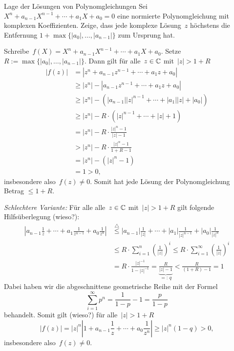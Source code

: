 \documentclass{algblatt}
\begin{document}
\vspace*{-1.5cm}

\begin{aufgabe}{Lage der Lösungen von Polynomgleichungen}
Sei $X^n + a_{n - 1} X^{n - 1} + \cdots + a_1 X + a_0 = 0$ eine normierte
Polynomgleichung mit komplexen Koeffizienten. Zeige, dass jede komplexe
Lösung~$z$ höchstens die Entfernung
$1+\max\{|a_0|,\ldots,|a_{n-1}|\}$ zum Ursprung hat.
\begin{loesung}
Schreibe~$f(X) = X^n + a_{n - 1} X^{n - 1} + \cdots + a_1 X + a_0$.
Setze~$R := \max\{|a_0|,\ldots,|a_{n-1}|\}$. Dann gilt für alle~$z \in \mathbb{C}$
mit~$|z| > 1 + R$
\begin{align*}
  |f(z)| &= |z^n + a_{n-1}z^{n-1} + \cdots + a_1 z + a_0| \\
  &\geq |z^n| - |a_{n-1}z^{n-1} + \cdots + a_1 z + a_0| \\
  &\geq |z^n| - \left(|a_{n-1}| |z|^{n-1} + \cdots + |a_1| |z| + |a_0|\right) \\
  &\geq |z^n| - R \cdot \left(|z|^{n-1} + \cdots + |z| + 1\right) \\
  &= |z^n| - R \cdot \frac{|z|^n-1}{|z|-1} \\
  &> |z^n| - R \cdot \frac{|z|^n-1}{1+R-1} \\
  &= |z^n| - (|z|^n - 1) \\
  &= 1 > 0,
\end{align*}
insbesondere also~$f(z) \neq 0$. Somit hat jede Lösung der Polynomgleichung
Betrag $\leq 1 + R$.

\emph{Schlechtere Variante:}
Für alle alle~$z \in \mathbb{C}$ mit~$|z| > 1 + R$ gilt folgende Hilfsüberlegung (wieso?):
\begin{align*}
  \left|a_{n-1} \frac{1}{z} + \cdots + a_1 \frac{1}{z^{n-1}} + a_0
  \frac{1}{z^n}\right| &\stackrel{\triangle}{\leq}
  |a_{n-1}| \frac{1}{|z|} + \cdots + |a_1| \frac{1}{|z|^{n-1}} + |a_0|
  \frac{1}{|z|^n} \\
  &\leq R \cdot \sum_{i=1}^n \left(\frac{1}{|z|}\right)^i
  \leq R \cdot \sum_{i=1}^\infty \left(\frac{1}{|z|}\right)^i \\
  &= R \cdot \frac{|z|^{-1}}{1 - |z|^{-1}} =
  \underbrace{\frac{R}{|z| - 1}}_{=:\,q} < \frac{R}{(1+R)-1} = 1
\end{align*}
Dabei haben wir die abgeschnittene geometrische Reihe mit der Formel
\[ \sum_{i=1}^\infty p^n = \frac{1}{1 - p} - 1 =
  \frac{p}{1-p} \]
behandelt. Somit gilt (wieso?) für alle~$|z| > 1 + R$
\[ |f(z)| = |z|^n \left|1 + a_{n-1} \frac{1}{z} + \cdots + a_0 \frac{1}{z^n}\right|
  \geq |z|^n \left(1 - q\right) > 0, \]
insbesondere also~$f(z) \neq 0$.


\end{loesung}
\end{aufgabe}
\end{document}
